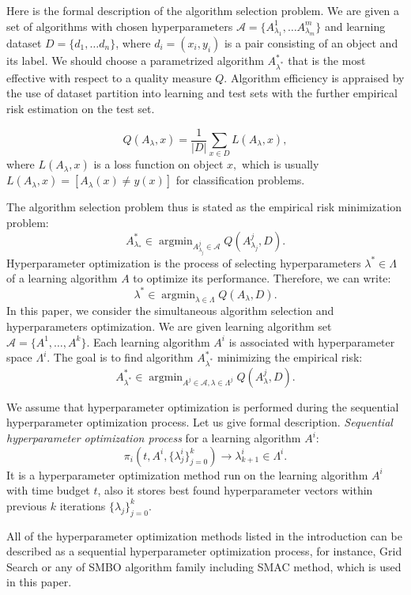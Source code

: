 \documentclass{svproc}
\DeclareMathOperator*{\argmin}{argmin}
\begin{document}
Here is the formal description of the algorithm selection problem. We are given a set of algorithms with chosen hyperparameters $\mathcal{A} = \{A^1_{\lambda_1}, \dots A^m_{\lambda_m}\}$ and learning dataset $D = \{d_1, \dots d_n\}$, where $d_i = (x_i, y_i)$ is a pair consisting of an object and its label. We should choose a parametrized algorithm  $A^*_{\lambda^*}$ that is the most effective with respect to a quality measure $Q$. Algorithm efficiency is appraised by the use of dataset partition into learning and test sets with the further empirical risk estimation on the test set. 

\[
Q(A_{\lambda}, x) = \frac {1} {|D|} \sum_{x \in D} L(A_{\lambda}, x),
\]
where $L(A_{\lambda}, x)$ is a loss function on object $x,$ which is usually $L(A_{\lambda}, x) = [A_{\lambda}(x) \neq y(x)]$
for classification problems.

The algorithm selection problem thus is stated as the empirical risk minimization problem:
\[
A^*_{\lambda_*} \in \argmin_{A^j_{\lambda_j} \in \mathcal{A}} Q(A^j_{\lambda_j}, D).
\]
Hyperparameter optimization is the process of selecting hyperparameters $\lambda^* \in \Lambda$ of a learning algorithm $A$ to optimize its performance. Therefore, we can write:
\[
\lambda^* \in \argmin_{\lambda \in \Lambda} Q(A_{\lambda}, D).
\]
In this paper, we consider the simultaneous algorithm selection and hyperparameters optimization. We are given learning algorithm set $\mathscr{A}=\{A^1, \dots , A^k\}.$ Each learning algorithm $A^i$ is associated with hyperparameter space $\Lambda^i$. The goal is to find algorithm $A^*_{\lambda^*}$ minimizing the empirical risk:
\[
A^*_{\lambda^*} \in \argmin_{A^j \in \mathscr{A}, \lambda \in \Lambda^j} Q(A_{\lambda}^j, D).
\]

We assume that hyperparameter optimization is performed during the sequential hyperparameter optimization process. Let us give formal description. \emph{Sequential hyperparameter optimization process} for a learning algorithm $A^i$: 
\[
\pi_i(t, A^i, \{\lambda^i_j\}^k_{j=0}) \rightarrow \lambda^i_{k+1} \in \Lambda^i.
\]
It is a hyperparameter optimization method run on the learning algorithm $A^i$ with time budget $t$, also it stores best found hyperparameter vectors within previous $k$ iterations $\{\lambda_j\}^k_{j=0}$. 

All of the hyperparameter optimization methods listed in the introduction can be described as a sequential hyperparameter optimization process, for instance, Grid Search or any of SMBO algorithm family including SMAC method, which is used in this paper. 
 
\end{document}
